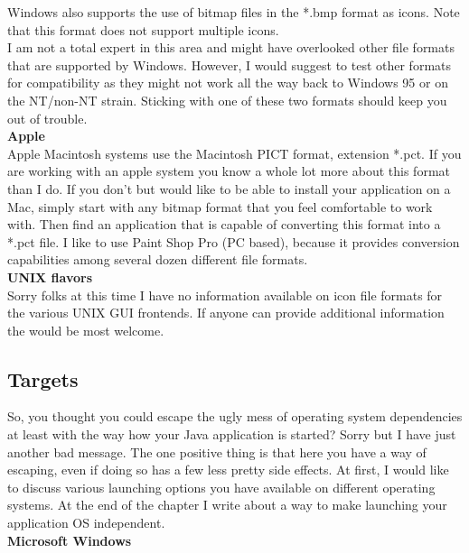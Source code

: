 Windows also supports the use of bitmap files in the *.bmp format as
icons. Note that this format does not support multiple icons.\\

I am not a total expert in this area and might have overlooked other file
formats that are supported by Windows. However, I would suggest to test
other formats for compatibility as they might not work all the way back
to Windows 95 or on the NT/non-NT strain. Sticking with one of these two
formats should keep you out of trouble.\\

\textbf{Apple}\\

Apple Macintosh systems use the Macintosh PICT format, extension *.pct.
If you are working with an apple system you know a whole lot more about
this format than I do. If you don't but would like to be able to install
your application on a Mac, simply start with any bitmap format that you
feel comfortable to work with. Then find an application that is capable
of converting this format into a *.pct file. I like to use Paint Shop
Pro (PC based), because it provides conversion capabilities among
several dozen different file formats.\\

\textbf{UNIX flavors}\\

Sorry folks at this time I have no information available on icon file
formats for the various UNIX GUI frontends. If anyone can provide
additional information the would be most welcome.\\

\subsection{Targets}

So, you thought you could escape the ugly mess of operating system
dependencies at least with the way how your Java application is started?
Sorry but I have just another bad message. The one positive thing is
that here you have a way of escaping, even if doing so has a few less
pretty side effects. At first, I would like to discuss various launching
options you have available on different operating systems. At the end of
the chapter I write about a way to make launching your application OS
independent.\\

\textbf{Microsoft Windows}\\

